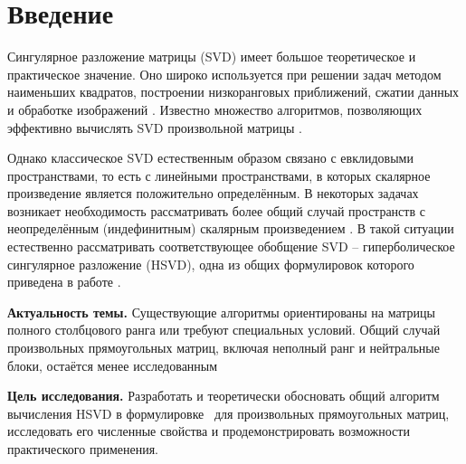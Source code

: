 \documentclass[a4paper,12pt]{article}
\theoremstyle{csstyle}
\begin{document}
\newpage
\tableofcontents
\newpage

\section*{Введение}
{}

Сингулярное разложение матрицы (SVD) имеет большое теоретическое и практическое значение. Оно широко используется при решении задач методом наименьших квадратов, построении низкоранговых приближений, сжатии данных и обработке изображений \cite{Kalman}.
Известно множество алгоритмов, позволяющих эффективно вычислять SVD произвольной матрицы \cite{Golub}.

Однако классическое SVD естественным образом связано с евклидовыми пространствами, то есть с линейными пространствами, в которых скалярное произведение является положительно определённым. В некоторых задачах возникает необходимость рассматривать более общий случай пространств с неопределённым (индефинитным) скалярным произведением \cite{BOS, ILS, ShirokovYM}. В такой ситуации естественно рассматривать соответствующее обобщение SVD -- гиперболическое сингулярное разложение (HSVD), одна из общих формулировок которого приведена в работе \cite{BOS}.

\textbf{Актуальность темы.} 
Существующие алгоритмы ориентированы на матрицы полного столбцового ранга или требуют специальных условий. Общий случай произвольных прямоугольных матриц, включая неполный ранг и нейтральные блоки, остаётся менее исследованным

\textbf{Цель исследования.} Разработать и теоретически обосновать общий алгоритм вычисления HSVD
в формулировке~\cite{Shirokov} для произвольных прямоугольных матриц,
исследовать его численные свойства и продемонстрировать возможности
практического применения.
\end{document}
